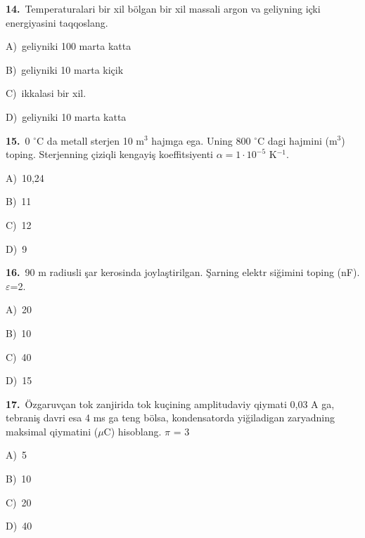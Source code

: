 \documentclass[11pt,a4paper]{article}
\newcommand{\opt}[2]{\hspace*{4mm}#1)\ #2\par}
\begin{document}
\noindent\begin{minipage}{\linewidth}
\textbf{14.}\ Temperaturalari bir xil bölgan bir xil massali argon va geliyning içki energiyasini taqqoslang.\par\smallskip
\opt{A}{geliyniki 100 marta katta}
\opt{B}{geliyniki 10 marta kiçik}
\opt{C}{ikkalasi bir xil.}
\opt{D}{geliyniki 10 marta katta}
\end{minipage}\vspace{9pt}\par
\noindent\begin{minipage}{\linewidth}
\textbf{15.}\ 0 $^\circ$C da metall sterjen 10 m$^{3}$ hajmga ega. Uning 800 $^\circ$C dagi hajmini (m$^{3}$) toping. Sterjenning çiziqli kengayiş koeffitsiyenti $\alpha=1\cdot10^{-5}$ K$^{-1}$.\par\smallskip
\opt{A}{10,24}
\opt{B}{11}
\opt{C}{12}
\opt{D}{9}
\end{minipage}\vspace{9pt}\par
\noindent\begin{minipage}{\linewidth}
\textbf{16.}\ 90 m radiusli şar kerosinda joylaştirilgan. Şarning elektr siğimini toping (nF). $\varepsilon$=2.\par\smallskip
\opt{A}{20}
\opt{B}{10}
\opt{C}{40}
\opt{D}{15}
\end{minipage}\vspace{9pt}\par
\noindent\begin{minipage}{\linewidth}
\textbf{17.}\ Özgaruvçan tok zanjirida tok kuçining amplitudaviy qiymati 0,03 A ga, tebraniş davri esa 4 ms ga teng bölsa, kondensatorda yiğiladigan zaryadning maksimal qiymatini ($\mu$C) hisoblang. $\pi$ = 3\par\smallskip
\opt{A}{5}
\opt{B}{10}
\opt{C}{20}
\opt{D}{40}
\end{minipage}\vspace{9pt}\par
\end{document}
